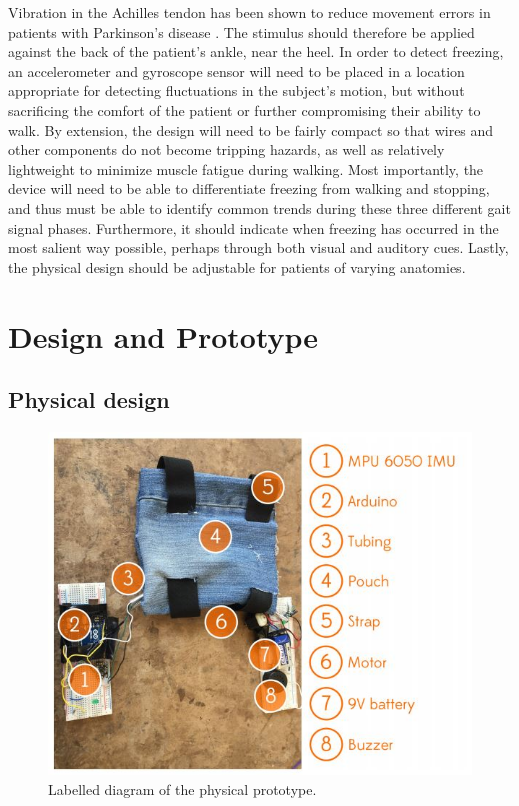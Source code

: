 \documentclass[titlepage]{article}
\begin{document}
\begin{doublespacing}
Vibration in the Achilles tendon has been shown to reduce movement errors in patients with Parkinson's disease \cite{almeida}. The stimulus should therefore be applied against the back of the patient's ankle, near the heel. In order to detect freezing, an accelerometer and gyroscope sensor will need to be placed in a location appropriate for detecting fluctuations in the subject's motion, but without sacrificing the comfort of the patient or further compromising their ability to walk. By extension, the design will need to be fairly compact so that wires and other components do not become tripping hazards, as well as relatively lightweight to minimize muscle fatigue during walking. Most importantly, the device will need to be able to differentiate freezing from walking and stopping, and thus must be able to identify common trends during these three different gait signal phases. Furthermore, it should indicate when freezing has occurred in the most salient way possible, perhaps through both visual and auditory cues. Lastly, the physical design should be adjustable for patients of varying anatomies.

\clearpage
\section{Design and Prototype}
\subsection{Physical design}

\begin{figure}[H]
	\includegraphics[width=\linewidth]{labelled-design}
	\caption{Labelled diagram of the physical prototype.}
	\label{labelled}
\end{figure}


\end{doublespacing}
\end{document}

